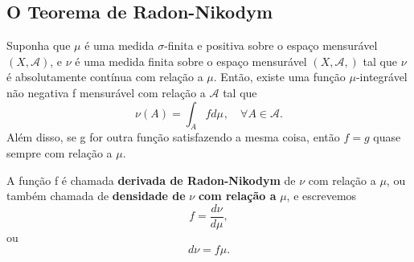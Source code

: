 \documentclass[MeasureTheory/measure_theory.tex]{subfiles}
\begin{document}
\subsection{O Teorema de Radon-Nikodym}
\hypertarget{radon_nikodym}{
	\begin{theorem*}
		Suponha que \(\mu \) é uma medida \(\sigma \)-finita e positiva sobre o espaço mensurável \((X, \mathcal{A})\), e \(\nu \) é uma medida finita sobre o espaço mensurável \((X, \mathcal{A},)\) tal que \(\nu \) é absolutamente
		contínua com relação a \(\mu \). Então, existe uma função \(\mu \)-integrável não negativa f mensurável com relação a \(\mathcal{A}\) tal que
		\[
			\nu (A) = \int_{A}f d\mu_{},\quad \forall A\in \mathcal{A}.
		\]
		Além disso, se g for outra função satisfazendo a mesma coisa, então \(f = g\) quase sempre com relação a \(\mu \).
	\end{theorem*}}
A função f é chamada \textbf{derivada de Radon-Nikodym} de \(\nu \) com relação a \(\mu \), ou também chamada de \textbf{densidade de }\(\nu \) \textbf{com relação a }\(\mu \), e escrevemos
\[
	f= \frac{d\nu }{d\mu },
\]
ou
\[
	d\nu = f\mu.
\]
\end{document}
